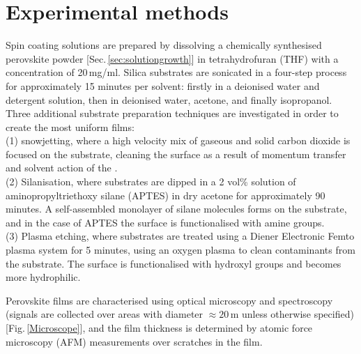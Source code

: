 \section{Experimental methods}
\label{sec:glass}
Spin coating solutions are prepared by dissolving a chemically synthesised perovskite powder [Sec.\,\ref{sec:solutiongrowth}] in tetrahydrofuran (THF) with a concentration of 20\,mg/ml. Silica substrates are sonicated in a four-step process for approximately 15 minutes per solvent: firstly in a deionised water and detergent solution, then in deionised water, acetone, and finally isopropanol. Three additional substrate preparation techniques are investigated in order to create the most uniform films: \\
(1)  snowjetting, where a high velocity mix of gaseous and solid carbon dioxide is focused on the substrate, cleaning the surface as a result of momentum transfer and solvent action of the  \cite{Snowjet}. \\
(2) Silanisation, where substrates are dipped in a 2 vol\% solution of aminopropyltriethoxy silane (APTES) in dry acetone for approximately 90 minutes. A self-assembled monolayer of silane molecules forms on the substrate, and in the case of APTES the surface is functionalised with amine groups. \\
(3) Plasma etching, where substrates are treated using a Diener Electronic Femto plasma system for 5 minutes, using an oxygen plasma to clean contaminants from the substrate. The surface is functionalised with hydroxyl groups and becomes more hydrophilic.

Perovskite films are characterised using optical microscopy and spectroscopy (signals are collected over areas with diameter $\approx 20$\,\textmu m unless otherwise specified) [Fig.\,\ref{Microscope}], and the film thickness is determined by atomic force microscopy (AFM) measurements over scratches in the film.

